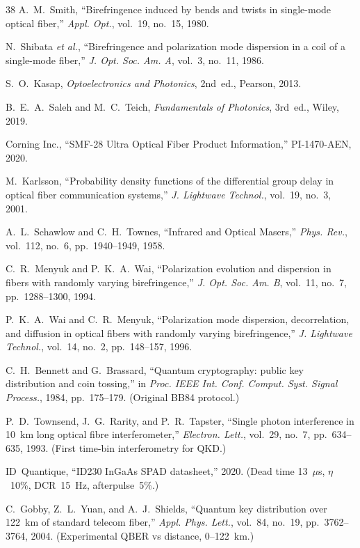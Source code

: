 \documentclass[11pt,a4paper]{article}
\begin{document}
\begin{thebibliography}{38}
A.~M.~Smith, ``Birefringence induced by bends and twists in single-mode
optical fiber,'' \textit{Appl. Opt.}, vol.~19, no.~15, 1980.

N.~Shibata \textit{et al.}, ``Birefringence and polarization mode
dispersion in a coil of a single-mode fiber,'' \textit{J. Opt. Soc. Am. A},
vol.~3, no.~11, 1986.

S.~O.~Kasap, \textit{Optoelectronics and Photonics}, 2nd~ed., Pearson,
2013.

B.~E.~A.~Saleh and M.~C.~Teich, \textit{Fundamentals of Photonics},
3rd~ed., Wiley, 2019.

Corning Inc., ``SMF-28 Ultra Optical Fiber Product Information,''
PI-1470-AEN, 2020.

M.~Karlsson, ``Probability density functions of the differential group
delay in optical fiber communication systems,'' \textit{J. Lightwave
Technol.}, vol.~19, no.~3, 2001.

A.~L.~Schawlow and C.~H.~Townes, ``Infrared and Optical Masers,''
\textit{Phys. Rev.}, vol.~112, no.~6, pp.~1940--1949, 1958.

C.~R.~Menyuk and P.~K.~A.~Wai, ``Polarization evolution and dispersion
in fibers with randomly varying birefringence,'' \textit{J. Opt. Soc.
Am. B}, vol.~11, no.~7, pp.~1288--1300, 1994.

P.~K.~A.~Wai and C.~R.~Menyuk, ``Polarization mode dispersion,
decorrelation, and diffusion in optical fibers with randomly varying
birefringence,'' \textit{J. Lightwave Technol.}, vol.~14, no.~2,
pp.~148--157, 1996.

C.~H.~Bennett and G.~Brassard, ``Quantum cryptography: public key
distribution and coin tossing,'' in \textit{Proc. IEEE Int. Conf.
Comput. Syst. Signal Process.}, 1984, pp.~175--179.  \hfill
(Original BB84 protocol.)

P.~D.~Townsend, J.~G.~Rarity, and P.~R.~Tapster, ``Single photon
interference in 10~km long optical fibre interferometer,''
\textit{Electron. Lett.}, vol.~29, no.~7, pp.~634--635, 1993.  \hfill
(First time-bin interferometry for QKD.)

ID~Quantique, ``ID230 InGaAs SPAD datasheet,'' 2020.  \hfill
(Dead time 13~$\mu$s, $\eta$~10\%, DCR~15~Hz, afterpulse~5\%.)

C.~Gobby, Z.~L.~Yuan, and A.~J.~Shields, ``Quantum key distribution
over 122~km of standard telecom fiber,'' \textit{Appl. Phys. Lett.},
vol.~84, no.~19, pp.~3762--3764, 2004.  \hfill
(Experimental QBER vs distance, 0--122~km.)


\end{thebibliography}
\end{document}
